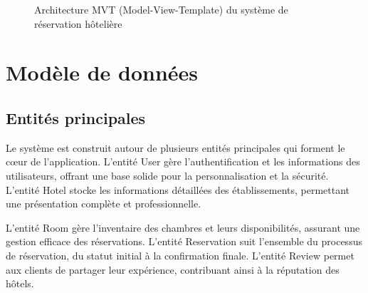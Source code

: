 \documentclass[12pt,a4paper]{report}
\begin{document}
\begin{figure}[H]
{
}%
\caption{Architecture MVT (Model-View-Template) du système de réservation hôtelière}
\label{fig:mvt_architecture}
\end{figure}

\section{Modèle de données}
\subsection{Entités principales}
Le système est construit autour de plusieurs entités principales qui forment le cœur de l'application. L'entité User gère l'authentification et les informations des utilisateurs, offrant une base solide pour la personnalisation et la sécurité. L'entité Hotel stocke les informations détaillées des établissements, permettant une présentation complète et professionnelle.

L'entité Room gère l'inventaire des chambres et leurs disponibilités, assurant une gestion efficace des réservations. L'entité Reservation suit l'ensemble du processus de réservation, du statut initial à la confirmation finale. L'entité Review permet aux clients de partager leur expérience, contribuant ainsi à la réputation des hôtels.
\end{document}
